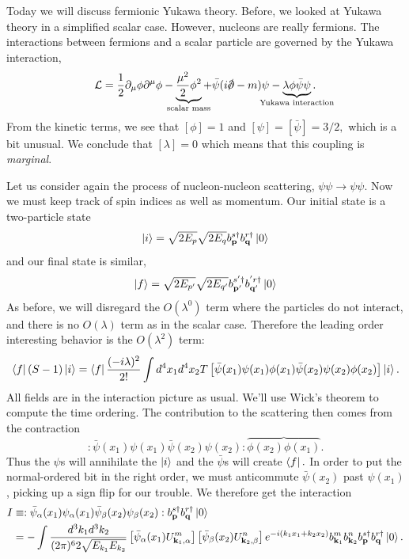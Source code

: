 Today we will discuss fermionic Yukawa theory. Before, we looked at Yukawa theory in a simplified scalar case. However, nucleons are really fermions. The interactions between fermions and a scalar particle are governed by the Yukawa interaction,
\begin{equation}
    \cL=\frac{1}{2}\p_\mu \phi \p^\mu \phi -\underbrace{\frac{\mu^2}{2}\phi^2}_{\mathclap{\text{scalar mass}}} +\bar \psi (i\slashed{\p}-m)\psi -\underbrace{\lambda \phi \bar \psi \psi}_{\mathclap{\text{Yukawa interaction}}}.
\end{equation}
From the kinetic terms, we see that $[\phi]=1$ and $[\psi]=[\bar \psi]=3/2,$ which is a bit unusual. We conclude that $[\lambda]=0$ which means that this coupling is \emph{marginal}.

Let us consider again the process of nucleon-nucleon scattering, $\psi\psi\to \psi\psi.$ Now we must keep track of spin indices as well as momentum. Our initial state is a two-particle state
$$\left| i \right>=\sqrt{2E_p}\sqrt{2E_q}b_{\boldsymbol{\mathbf{p}}}^{s\dagger}b_{\boldsymbol{\mathbf{q}}}^{r\dagger}\left| 0 \right>$$
and our final state is similar,
$$\left| f \right>=\sqrt{2E_{p'}}\sqrt{2E_{q'}}b_{\boldsymbol{\mathbf{p}}'}^{s'\dagger}b_{\boldsymbol{\mathbf{q}}'}^{'r\dagger}\left| 0 \right>$$
As before, we will disregard the $O(\lambda^0)$ term where the particles do not interact, and there is no $O(\lambda)$ term as in the scalar case. Therefore the leading order interesting behavior is the $O(\lambda^2)$ term:
\begin{equation}
    \left< f \right|(S-1)\left| i \right>=\left< f \right|\frac{(-i\lambda)^2}{2!}\int d^4 x_1 d^4 x_2 T\left[\bar \psi(x_1)\psi(x_1)\phi(x_1)\bar \psi(x_2)\psi(x_2)\phi(x_2)\right]\left| i \right>.
\end{equation}
All fields are in the interaction picture as usual. We'll use Wick's theorem to compute the time ordering. The contribution to the scattering then comes from the contraction
$$:\bar \psi(x_1)\psi(x_1)\bar \psi(x_2)\psi(x_2):\overbrace{\phi(x_2)\phi(x_1)}.$$
Thus the $\psi$s will annihilate the $\left| i \right>$ and the $\bar \psi$s will create $\left< f \right|.$ In order to put the normal-ordered bit in the right order, we must anticommute $\bar \psi(x_2)$ past $\psi(x_1)$, picking up a sign flip for our trouble. We therefore get the interaction
\begin{align*}
    I&\equiv :\bar \psi_\alpha(x_1)\psi_\alpha(x_1)\bar \psi_\beta(x_2)\psi_\beta(x_2): b_{\boldsymbol{\mathbf{p}}}^{s\dagger} b_{\boldsymbol{\mathbf{q}}}^{r\dagger}\left| 0 \right>\\
    &=- \int \frac{d^3k_1 d^3k_2}{(2\pi)^6 2\sqrt{E_{k_1} E_{k_2}}} \left[\bar \psi_\alpha(x_1) U_{\boldsymbol{\mathbf{k}}_1,\alpha}^m\right] \left[\bar\psi_\beta (x_2) U_{\boldsymbol{\mathbf{k}}_2,\beta}^n\right] e^{-i(k_1x_1+k_2x_2)}b_{\boldsymbol{\mathbf{k}}_1}^m b_{\boldsymbol{\mathbf{k}}_2}^n b_{\boldsymbol{\mathbf{p}}}^{s\dagger} b_{\boldsymbol{\mathbf{q}}}^{r\dagger}\left| 0 \right>.
\end{align*}
